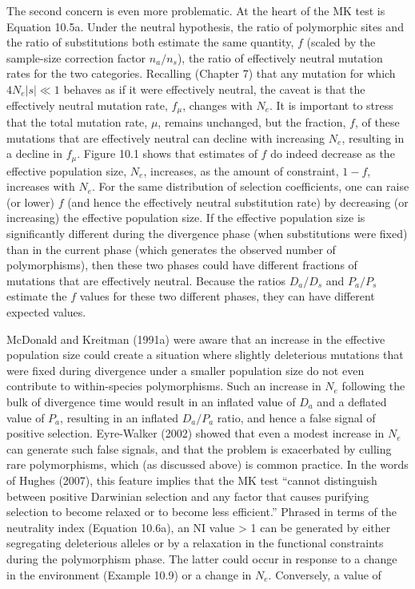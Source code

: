 \documentclass{article}
\begin{document}
The second concern is even more problematic. At the heart of the MK test is Equation 10.5a. Under the neutral hypothesis, the ratio of polymorphic sites and the ratio of substitutions both estimate the same quantity,  $ f $ (scaled by the sample-size correction factor  $ n_a/n_s $), the ratio of effectively neutral mutation rates for the two categories. Recalling (Chapter 7) that any mutation for which  $ 4N_e|s| \ll 1 $ behaves as if it were effectively neutral, the caveat is that the effectively neutral mutation rate,  $ f_\mu $, changes with  $ N_e $. It is important to stress that the total mutation rate,  $ \mu $, remains unchanged, but the fraction,  $ f $, of these mutations that are effectively neutral can decline with increasing  $ N_e $, resulting in a decline in  $ f_\mu $. Figure 10.1 shows that estimates of  $ f $ do indeed decrease as the effective population size,  $ N_e $, increases, as the amount of constraint,  $ 1 - f $, increases with  $ N_e $. For the same distribution of selection coefficients, one can raise (or lower)  $ f $ (and hence the effectively neutral substitution rate) by decreasing (or increasing) the effective population size. If the effective population size is significantly different during the divergence phase (when substitutions were fixed) than in the current phase (which generates the observed number of polymorphisms), then these two phases could have different fractions of mutations that are effectively neutral. Because the ratios  $ D_a/D_s $ and  $ P_a/P_s $ estimate the  $ f $ values for these two different phases, they can have different expected values.

McDonald and Kreitman (1991a) were aware that an increase in the effective population size could create a situation where slightly deleterious mutations that were fixed during divergence under a smaller population size do not even contribute to within-species polymorphisms. Such an increase in  $ N_e $ following the bulk of divergence time would result in an inflated value of  $ D_a $ and a deflated value of  $ P_a $, resulting in an inflated  $ D_a/P_a $ ratio, and hence a false signal of positive selection. Eyre-Walker (2002) showed that even a modest increase in  $ N_e $ can generate such false signals, and that the problem is exacerbated by culling rare polymorphisms, which (as discussed above) is common practice. In the words of Hughes (2007), this feature implies that the MK test “cannot distinguish between positive Darwinian selection and any factor that causes purifying selection to become relaxed or to become less efficient.” Phrased in terms of the neutrality index (Equation 10.6a), an NI value > 1 can be generated by either segregating deleterious alleles or by a relaxation in the functional constraints during the polymorphism phase. The latter could occur in response to a change in the environment (Example 10.9) or a change in  $ N_e $. Conversely, a value of
\end{document}
